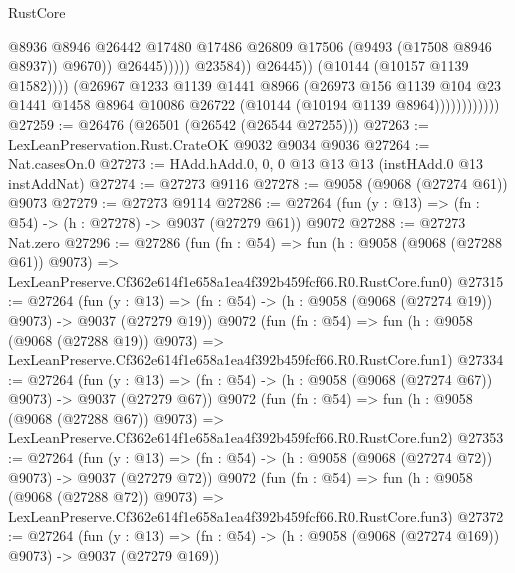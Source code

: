 \begin{lexlean}{RustCore}
\begin{coremodule}
                                              @8936
                                              @8946
                                              @26442
                                              @17480
                                              @17486
                                              @26809
                                              @17506
                                              (@9493 (@17508 @8946 @8937))
                                              @9670))
                                          @26445)))))
                                @23584))
                            @26445))
                        (@10144 (@10157 @1139 @1582))))
                    (@26967
                      @1233
                      @1139
                      @1441
                      @8966
                      (@26973
                        @156
                        @1139
                        @104
                        @23
                        @1441
                        @1458
                        @8964
                        @10086
                        @26722
                        (@10144 (@10194 @1139 @8964))))))))))))
@27259 := @26476 (@26501 (@26542 (@26544 @27255)))
@27263 := LexLeanPreservation.Rust.CrateOK @9032 @9034 @9036
@27264 := Nat.casesOn.{0}
@27273 := HAdd.hAdd.{0, 0, 0} @13 @13 @13 (instHAdd.{0} @13 instAddNat)
@27274 := @27273 @9116
@27278 := @9058 (@9068 (@27274 @61)) @9073
@27279 := @27273 @9114
@27286 := @27264 (fun (y : @13) => (fn : @54) -> (h : @27278) -> @9037 (@27279 @61)) @9072
@27288 := @27273 Nat.zero
@27296 := @27286
    (fun (fn : @54) =>
    fun (h : @9058 (@9068 (@27288 @61)) @9073) =>
    LexLeanPreserve.Cf362e614f1e658a1ea4f392b459fcf66.R0.RustCore.fun0)
@27315 := @27264
    (fun (y : @13) => (fn : @54) -> (h : @9058 (@9068 (@27274 @19)) @9073) -> @9037 (@27279 @19))
    @9072
    (fun (fn : @54) =>
    fun (h : @9058 (@9068 (@27288 @19)) @9073) =>
    LexLeanPreserve.Cf362e614f1e658a1ea4f392b459fcf66.R0.RustCore.fun1)
@27334 := @27264
    (fun (y : @13) => (fn : @54) -> (h : @9058 (@9068 (@27274 @67)) @9073) -> @9037 (@27279 @67))
    @9072
    (fun (fn : @54) =>
    fun (h : @9058 (@9068 (@27288 @67)) @9073) =>
    LexLeanPreserve.Cf362e614f1e658a1ea4f392b459fcf66.R0.RustCore.fun2)
@27353 := @27264
    (fun (y : @13) => (fn : @54) -> (h : @9058 (@9068 (@27274 @72)) @9073) -> @9037 (@27279 @72))
    @9072
    (fun (fn : @54) =>
    fun (h : @9058 (@9068 (@27288 @72)) @9073) =>
    LexLeanPreserve.Cf362e614f1e658a1ea4f392b459fcf66.R0.RustCore.fun3)
@27372 := @27264
    (fun (y : @13) => (fn : @54) -> (h : @9058 (@9068 (@27274 @169)) @9073) -> @9037 (@27279 @169))

\end{coremodule}
\end{lexlean}
